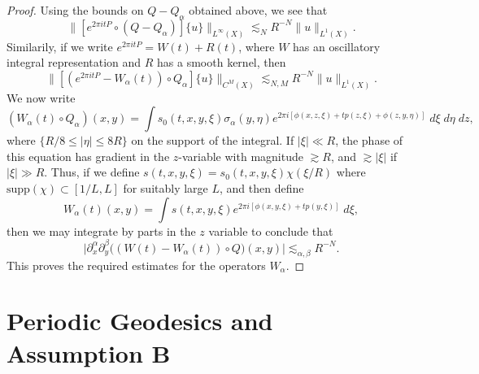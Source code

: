 \begin{proof}
    Using the bounds on $Q - Q_\alpha$ obtained above, we see that
    \begin{equation} \big\| [e^{2 \pi i t P} \circ (Q- Q_\alpha)] \{ u \} \big\|_{L^\infty(X)} \lesssim_N R^{-N} \| u \|_{L^1(X)}. \end{equation}
    Similarily, if we write $e^{2 \pi i t P} = W(t) + R(t)$, where $W$ has an oscillatory integral representation and $R$ has a smooth kernel, then
    \begin{equation}
        \big\| [(e^{2 \pi i t P} - W_\alpha(t)) \circ Q_\alpha] \{ u \} \big\|_{C^M(X)} \lesssim_{N,M} R^{-N} \| u \|_{L^1(X)}.
    \end{equation}
    We now write
    \begin{equation}
        (W_\alpha(t) \circ Q_\alpha)(x,y) = \int s_0(t,x,y,\xi) \sigma_\alpha(y,\eta) e^{2 \pi i [\phi(x,z,\xi) + t p(z,\xi) + \phi(z,y,\eta) ]}\; d\xi\; d\eta\; dz,
    \end{equation}
    where $\{ R/8 \leq |\eta| \leq 8R \}$ on the support of the integral. If $|\xi| \ll R$, the phase of this equation has gradient in the $z$-variable with magnitude $\gtrsim R$, and $\gtrsim |\xi|$ if $|\xi| \gg R$. Thus, if we define $s(t,x,y,\xi) = s_0(t,x,y,\xi) \chi(\xi / R)$ where $\text{supp}(\chi) \subset [1/L,L]$ for suitably large $L$, and then define
    \begin{equation} W_\alpha(t)(x,y) = \int s(t,x,y,\xi) e^{2 \pi i [ \phi(x,y,\xi) + t p(y,\xi) ]}\; d\xi, \end{equation}
    then we may integrate by parts in the $z$ variable to conclude that
    \begin{equation} \Big| \partial_x^\alpha \partial_y^\beta \big( (W(t) - W_\alpha(t)) \circ Q \big)(x,y) \Big| \lesssim_{\alpha,\beta} R^{-N}. \end{equation}
    This proves the required estimates for the operators $W_\alpha$.
\end{proof}








\section{Periodic Geodesics and Assumption B} \label{sec:PeriodicGeodesics}

